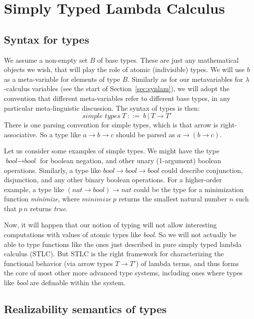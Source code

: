 \chapter{Simply Typed Lambda Calculus}

\section{Syntax for types}
\label{sec:synstlc}

We assume a non-empty set $B$ of base types.  These are just any
mathematical objects we wish, that will play the role of atomic
(indivisible) types.  We will use $b$ as a meta-variable for elements
of type $B$.  Similarly as for our metavariables for
$\lambda$-calculus variables (see the start of
Section~\ref{sec:synlam}), we will adopt the convention that different
meta-variables refer to different base types, in any particular
meta-linguistic discussion.  The syntax of types is
then:
\[
\textit{simple types}\ T\ ::= \ b\ |\ T \to T'
\]
\noindent There is one parsing convention for simple types, which is
that arrow is right-associative.  So a type like $a \to b \to c$
should be parsed as $a \to (b \to c)$.

Let us consider some examples of simple types.  We might have the type
$\textit{bool} \to \textit{bool}$ for boolean negation, and other
unary (1-argument) boolean operations.  Similarly, a type like
$\textit{bool} \to \textit{bool} \to \textit{bool}$ could describe
conjunction, disjunction, and any other binary boolean operations.
For a higher-order example, a type like $(\textit{nat} \to
\textit{bool}) \to \textit{nat}$ could be the type for a minimization
function \textit{minimize}, where $\textit{minimize}\ p$ returns the
smallest natural number $n$ such that $p\ n$ returns \textit{true}.

Now, it will happen that our notion of typing will not allow
interesting computations with values of atomic types like
\textit{bool}.  So we will not actually be able to type functions like
the ones just described in pure simply typed lambda calculus (STLC).
But STLC is the right framework for characterizing the functional
behavior (via arrow types $T \to T'$) of lambda terms, and thus forms
the core of most other more advanced type systems, including ones
where types like \textit{bool} are definable within the system.

\section{Realizability semantics of types}
\label{sec:stlcrealizability}

